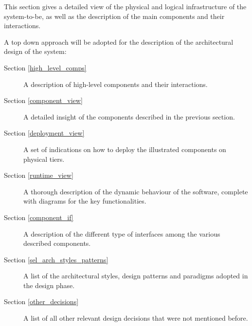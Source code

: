 This section gives a detailed view of the physical and logical infrastructure of the system-to-be, as well as the description of the main components and their interactions.

A top down approach will be adopted for the description of the architectural design of the system:
\begin{description}
\item[Section \ref{high_level_comps}] A description of high-level components and their interactions.
\item[Section \ref{component_view}] A detailed insight of the components described in the previous section.
\item[Section \ref{deployment_view}] A set of indications on how to deploy the illustrated components on physical tiers.
\item[Section \ref{runtime_view}] A thorough description of the dynamic behaviour of the software, complete with diagrams for the key functionalities.
\item[Section \ref{component_if}] A description of the different type of interfaces among the various described components.
\item[Section \ref{sel_arch_styles_patterns}] A list of the architectural styles, design patterns and paradigms adopted in the design phase.
\item[Section \ref{other_decisions}] A list of all other relevant design decisions that were not mentioned before.
\end{description}